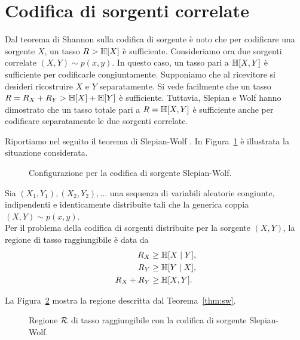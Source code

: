 \section{Codifica di sorgenti correlate}
\label{sec:correlated-sources-encoding}

Dal teorema di Shannon sulla codifica di sorgente
\cite{10.1002/j.1538-7305.1948.tb01338.x} è noto che per codificare una
sorgente \(X\), un tasso \(R > \entropy{X}\) è sufficiente. Consideriamo ora
due sorgenti correlate \((X,Y) \sim p(x, y)\). In questo caso, un tasso pari a
\(\entropy{X,Y}\) è sufficiente per codificarle congiuntamente. Supponiamo che
al ricevitore si desideri ricostruire \(X\) e \(Y\) separatamente. Si vede
facilmente che un tasso \(R = R_X + R_Y > \entropy{X} + \entropy{Y}\) è
sufficiente. Tuttavia, Slepian e Wolf \cite{1055037} hanno dimostrato che un
tasso totale pari a \(R = \entropy{X,Y}\) è sufficiente anche per codificare
separatamente le due sorgenti correlate.

Riportiamo nel seguito il teorema di Slepian-Wolf
\cite{10.1002/047174882X.ch15}. In Figura~\ref{fig:sw-configuration} è
illustrata la situazione considerata.

\begin{figure}[ht]
    \centering
    
    \caption{Configurazione per la codifica di sorgente Slepian-Wolf.}
    \label{fig:sw-configuration}
\end{figure}

\begin{thm}
    \label{thm:sw}

    Sia \((X_1,Y_1),(X_2,Y_2),\dots\) una sequenza di variabili aleatorie
    congiunte, indipendenti e identicamente distribuite tali che la generica
    coppia \((X,Y) \sim p(x, y)\).\\
    Per il problema della codifica di sorgenti distribuite per la sorgente
    \((X,Y)\), la regione di tasso raggiungibile è data da
    \begin{alignat}{1}
        R_X &\ge \entropy{X \given Y}, \label{eq:SW1} \\
        R_Y &\ge \entropy{Y \given X}, \label{eq:SW2} \\
        R_X + R_Y &\ge \entropy{X,Y}. \label{eq:SWsum}
    \end{alignat}
\end{thm}

La Figura~\ref{fig:sw-rate-region} mostra la regione descritta dal
Teorema~\ref{thm:sw}.

\begin{figure}[ht]
    \centering
    
    \caption{Regione \(\mathcal{R}\) di tasso raggiungibile con la codifica di
    sorgente Slepian-Wolf.}
    \label{fig:sw-rate-region}
\end{figure}
